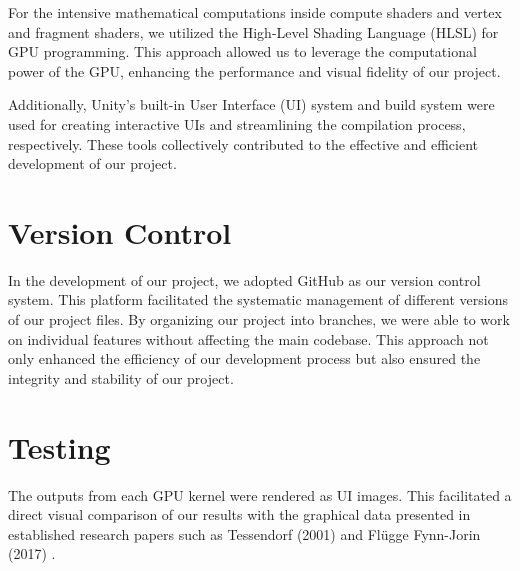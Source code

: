 For the intensive mathematical computations inside compute shaders and vertex and fragment shaders, we utilized the High-Level Shading Language (HLSL) for GPU programming. This approach allowed us to leverage the computational power of the GPU, enhancing the performance and visual fidelity of our project.

Additionally, Unity’s built-in User Interface (UI) system and build system were used for creating interactive UIs and streamlining the compilation process, respectively. These tools collectively contributed to the effective and efficient development of our project.

\section{Version Control}
In the development of our project, we adopted GitHub as our version control system. This platform facilitated the systematic management of different versions of our project files. By organizing our project into branches, we were able to work on individual features without affecting the main codebase. This approach not only enhanced the efficiency of our development process but also ensured the integrity and stability of our project.

\section{Testing}
The outputs from each GPU kernel were rendered as UI images. This facilitated a direct visual comparison of our results with the graphical data presented in established research papers such as Tessendorf (2001) \cite{tessendorf2001} and Fl{\"u}gge Fynn-Jorin (2017) \cite{flugge2017}.